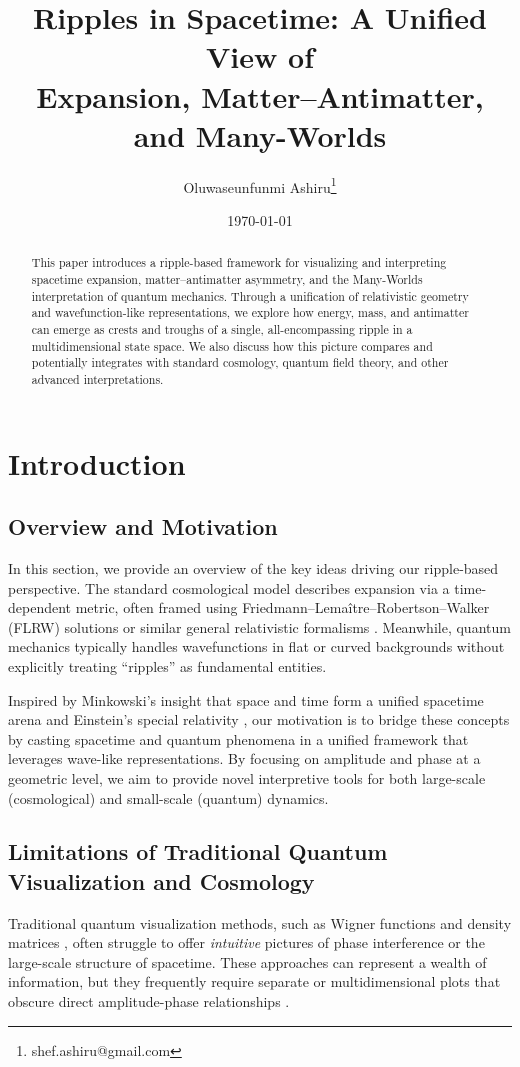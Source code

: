 \documentclass{article}
\title{\textbf{Ripples in Spacetime: A Unified View of \\
Expansion, Matter--Antimatter, and Many-Worlds}}
\author{Oluwaseunfunmi Ashiru\thanks{shef.ashiru@gmail.com}}
\date{\today}
\begin{document}
\maketitle

\begin{abstract}
  This paper introduces a ripple-based framework for visualizing and interpreting 
  spacetime expansion, matter--antimatter asymmetry, and the Many-Worlds 
  interpretation of quantum mechanics. Through a unification of relativistic 
  geometry and wavefunction-like representations, we explore how energy, mass, 
  and antimatter can emerge as crests and troughs of a single, all-encompassing 
  ripple in a multidimensional state space. We also discuss how this picture 
  compares and potentially integrates with standard cosmology, quantum field 
  theory, and other advanced interpretations. 
\end{abstract}
\section{Introduction}
\label{sec:introduction}

\subsection{Overview and Motivation}
\label{subsec:overview-motivation}
In this section, we provide an overview of the key ideas driving our 
ripple-based perspective. The standard cosmological model describes 
expansion via a time-dependent metric, often framed using 
Friedmann--Lemaître--Robertson--Walker (FLRW) solutions or similar 
general relativistic formalisms \cite{rindler1977essential, misner1973}.
Meanwhile, quantum mechanics typically handles wavefunctions in flat or 
curved backgrounds \cite{griffiths2005introduction, feynmanlectures} 
without explicitly treating ``ripples'' as fundamental entities. 

Inspired by Minkowski's insight that space and time form a unified 
spacetime arena \cite{minkowski1908space} and Einstein's special relativity 
\cite{einstein1905}, our motivation is to bridge these concepts by 
casting spacetime and quantum phenomena in a unified framework that 
leverages wave-like representations. By focusing on amplitude and phase 
at a geometric level, we aim to provide novel interpretive tools for 
both large-scale (cosmological) and small-scale (quantum) dynamics.

\subsection{Limitations of Traditional Quantum Visualization and Cosmology}
\label{subsec:limitations}
Traditional quantum visualization methods, such as Wigner functions 
\cite{wigner1932} and density matrices \cite{vonneumann1932}, often 
struggle to offer \emph{intuitive} pictures of phase interference or 
the large-scale structure of spacetime. These approaches can represent 
a wealth of information, but they frequently require separate or 
multidimensional plots that obscure direct amplitude-phase relationships 
\cite{husimi1940some, schleich2001quantum}.
\end{document}
